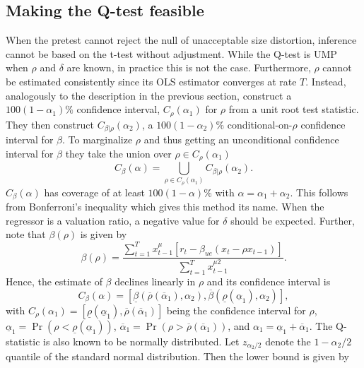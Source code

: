 \documentclass[11pt, a4paper]{article}
\begin{document}
\subsection{Making the Q-test feasible}
\label{Making the Q-test feasible}
When the pretest cannot reject the null of unacceptable size distortion, inference cannot be based on the t-test without adjustment. While the Q-test is UMP when $\rho$ and $\delta$ are known, in practice this is not the case. Furthermore, $\rho$ cannot be estimated consistently since its OLS estimator converges at rate $T$. Instead, analogously to the description in the previous section, \citet{campbell2006efficient} construct a $100\left(1-\alpha_{1}\right) \%$ confidence interval, $C_{\rho}\left(\alpha_{1}\right)$ for $\rho$ from a unit root test statistic. They then construct $C_{\beta | \rho}\left(\alpha_{2}\right)$, a $100\left(1-\alpha_{2}\right) \%$ conditional-on-$\rho$ confidence interval for $\beta$. To marginalize $\rho$ and thus getting an unconditional confidence interval for $\beta$ they take the union over $\rho \in C_{\rho}\left(\alpha_{1}\right)$
\begin{equation}
C_{\beta}(\alpha)=\bigcup_{\rho \in C_{\rho}\left(\alpha_{1}\right)} C_{\beta | \rho}\left(\alpha_{2}\right).
\end{equation}
$C_{\beta}(\alpha)$ has coverage of at least $100(1-\alpha) \%$ with $\alpha=\alpha_{1}+\alpha_{2}$. This follows from Bonferroni's inequality which gives this method its name.  
When the regressor is a valuation ratio, a negative value for $\delta$ should be expected. Further, note that $\beta(\rho)$ is given by 
\begin{equation}
\beta(\rho)=\frac{\sum_{t=1}^{T} x_{t-1}^{\mu}\left[r_{t}-\beta_{u e}\left(x_{t}-\rho x_{t-1}\right)\right]}{\sum_{t=1}^{T} x_{t-1}^{\mu 2}}.
\end{equation}
Hence, the estimate of $\beta$ declines linearly in $\rho$ and its confidence interval is 
\begin{equation}
C_{\beta}(\alpha)=\left[\underline{\beta}\left(\overline{\rho}\left(\overline{\alpha}_{1}\right), \alpha_{2}\right), \overline{\beta}\left(\underline{\rho}\left(\underline{\alpha}_{1}\right), \alpha_{2}\right)\right],
\end{equation}
with $C_{\rho}\left(\alpha_{1}\right)= \left[\underline{\rho}\left(\underline{\alpha}_{1}\right), \overline{\rho}\left(\overline{\alpha}_{1}\right)\right]$ being the confidence interval for $\rho$, $\underline{\alpha}_{1}=\operatorname{Pr}\left(\rho<\underline{\rho}\left(\underline{\alpha}_{1}\right)\right)$, $\overline{\alpha}_{1}=\operatorname{Pr}\left(\rho>\overline{\rho}\left(\overline{\alpha}_{1}\right)\right)$, and $\alpha_{1}=\underline{\alpha}_{1}+\overline{\alpha}_{1}$. The Q-statistic is also known to be normally distributed. Let $z_{\alpha_{2} / 2}$ denote the $1-\alpha_{2} / 2$ quantile of the standard normal distribution. Then the lower bound is given by
\end{document}
